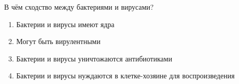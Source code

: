 
В чём сходство между
бактериями и вирусами?

\begin{enumerate}
    \item Бактерии и вирусы имеют ядра
    \item Могут быть вирулентными
    \item Бактерии и вирусы уничтожаются антибиотиками
    \item Бактерии и вирусы нуждаются в клетке-хозяине для воспроизведения
\end{enumerate}

\explanationSection

